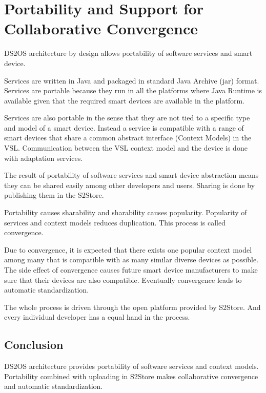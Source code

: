 \section{Portability and Support for Collaborative Convergence}
\label{sec:portability}

DS2OS architecture by design allows portability of software services and smart device.

Services are written in Java and packaged in standard Java Archive (jar) format. Services are portable because they run in all the platforms where Java Runtime is available given that the required smart devices are available in the platform. 

Services are also portable in the sense that they are not tied to a specific type and model of a smart device. Instead a service is compatible with a range of smart devices that share a common abstract interface (Context Models) in the VSL. Communication between the VSL context model and the device is done with adaptation services.

The result of portability of software services and smart device abstraction means they can be shared easily among other developers and users. Sharing is done by publishing them in the S2Store.

Portability causes sharability and sharability causes popularity. Popularity of services and context models reduces duplication. This process is called convergence.

Due to convergence, it is expected that there exists one popular context model among many that is compatible with as many similar diverse devices as possible. The side effect of convergence causes future smart device manufacturers to make sure that their devices are also compatible. Eventually convergence leads to automatic standardization.

The whole process is driven through the open platform provided by S2Store. And every individual developer has a equal hand in the process.

\subsection*{Conclusion}

DS2OS architecture provides portability of software services and context models. Portability combined with uploading in S2Store makes collaborative convergence and automatic standardization.

